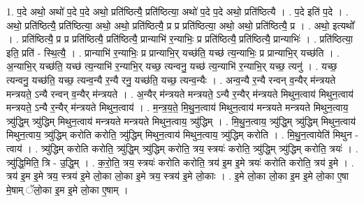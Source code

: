 \documentclass[17pt]{extarticle}
\begin{document}
1. प॒दे अथो॒ अथो॑ प॒दे प॒दे अथो॒ प्रति॑ष्ठित्यै॒ प्रति॑ष्ठित्या॒ अथो॑ प॒दे प॒दे अथो॒ प्रति॑ष्ठित्यै । . प॒दे इति॑ प॒दे । . अथो॒ प्रति॑ष्ठित्यै॒ प्रति॑ष्ठित्या॒ अथो॒ अथो॒ प्रति॑ष्ठित्यै॒ प्र प्र प्रति॑ष्ठित्या॒ अथो॒ अथो॒ प्रति॑ष्ठित्यै॒ प्र । . अथो॒ इत्यथो᳚ । . प्रति॑ष्ठित्यै॒ प्र प्र प्रति॑ष्ठित्यै॒ प्रति॑ष्ठित्यै॒ प्रान्याभि॑ र॒न्याभिः॒ प्र प्रति॑ष्ठित्यै॒ प्रति॑ष्ठित्यै॒ प्रान्याभिः॑ । . प्रति॑ष्ठित्या॒ इति॒ प्रति॑ - स्थि॒त्यै॒ । . प्रान्याभि॑ र॒न्याभिः॒ प्र प्रान्याभि॒र् यच्छ॑ति॒ यच्छ॑ त्य॒न्याभिः॒ प्र प्रान्याभि॒र् यच्छ॑ति । . अ॒न्याभि॒र् यच्छ॑ति॒ यच्छ॑ त्य॒न्याभि॑ र॒न्याभि॒र् यच्छ॒ त्यन्वनु॒ यच्छ॑ त्य॒न्याभि॑ र॒न्याभि॒र् यच्छ॒ त्यनु॑ । . यच्छ॒ त्यन्वनु॒ यच्छ॑ति॒ यच्छ॒ त्यन्व॒न्यै र॒न्यै रनु॒ यच्छ॑ति॒ यच्छ॒ त्यन्व॒न्यैः । . अन्व॒न्यै र॒न्यै रन्वन् व॒न्यैर् म॑न्त्रयते मन्त्रयते॒ ऽन्यै रन्वन् व॒न्यैर् म॑न्त्रयते । . अ॒न्यैर् म॑न्त्रयते मन्त्रयते॒ ऽन्यै र॒न्यैर् म॑न्त्रयते मिथुन॒त्वाय॑ मिथुन॒त्वाय॑ मन्त्रयते॒ ऽन्यै र॒न्यैर् म॑न्त्रयते मिथुन॒त्वाय॑ । . म॒न्त्र॒य॒ते॒ मि॒थु॒न॒त्वाय॑ मिथुन॒त्वाय॑ मन्त्रयते मन्त्रयते मिथुन॒त्वाय॒ त्र्यु॑द्धि॒म् त्र्यु॑द्धिम् मिथुन॒त्वाय॑ मन्त्रयते मन्त्रयते मिथुन॒त्वाय॒ त्र्यु॑द्धिम् । . मि॒थु॒न॒त्वाय॒ त्र्यु॑द्धि॒म् त्र्यु॑द्धिम् मिथुन॒त्वाय॑ मिथुन॒त्वाय॒ त्र्यु॑द्धिम् करोति करोति॒ त्र्यु॑द्धिम् मिथुन॒त्वाय॑ मिथुन॒त्वाय॒ त्र्यु॑द्धिम् करोति । . मि॒थु॒न॒त्वायेति॑ मिथुन - त्वाय॑ । . त्र्यु॑द्धिम् करोति करोति॒ त्र्यु॑द्धि॒म् त्र्यु॑द्धिम् करोति॒ त्रय॒ स्त्रयः॑ करोति॒ त्र्यु॑द्धि॒म् त्र्यु॑द्धिम् करोति॒ त्रयः॑ । . त्र्यु॑द्धि॒मिति॒ त्रि - उ॒द्धि॒म् । . क॒रो॒ति॒ त्रय॒ स्त्रयः॑ करोति करोति॒ त्रय॑ इ॒म इ॒मे त्रयः॑ करोति करोति॒ त्रय॑ इ॒मे । . त्रय॑ इ॒म इ॒मे त्रय॒ स्त्रय॑ इ॒मे लो॒का लो॒का इ॒मे त्रय॒ स्त्रय॑ इ॒मे लो॒काः । . इ॒मे लो॒का लो॒का इ॒म इ॒मे लो॒का ए॒षा मे॒षाम् ॅलो॒का इ॒म इ॒मे लो॒का ए॒षाम् । \newline
\end{document}
